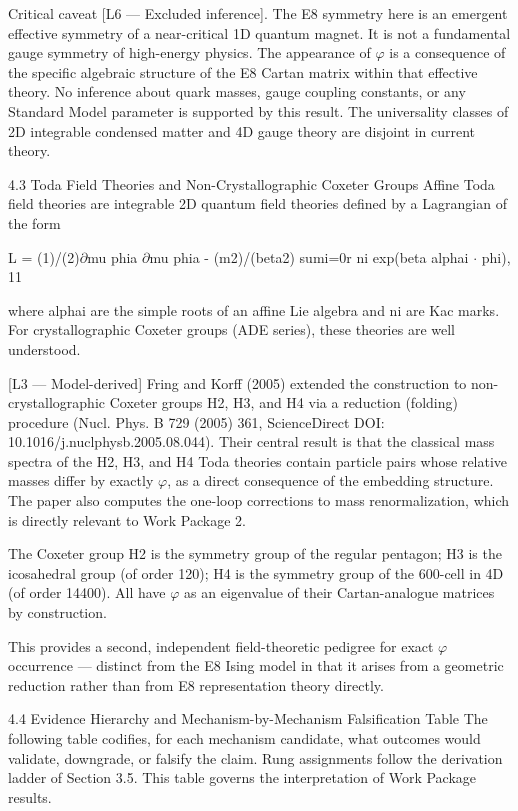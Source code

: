   Critical caveat [L6 --- Excluded inference]. The E8 symmetry here is an emergent
  effective symmetry of a near-critical 1D quantum magnet. It is not a fundamental gauge
  symmetry of high-energy physics. The appearance of $\varphi$ is a consequence of the specific
  algebraic structure of the E8 Cartan matrix within that effective theory. No inference
  about quark masses, gauge coupling constants, or any Standard Model parameter is
  supported by this result. The universality classes of 2D integrable condensed matter
  and 4D gauge theory are disjoint in current theory.

  4.3 Toda Field Theories and Non-Crystallographic Coxeter Groups
  Affine Toda field theories are integrable 2D quantum field theories defined by a
  Lagrangian of the form

  L = (1)/(2)$\partial$mu phia $\partial$mu phia - (m2)/(beta2) sumi=0r ni exp(beta alphai $\cdot$ phi), 11

  where alphai are the simple roots of an affine Lie algebra and ni are Kac marks. For
  crystallographic Coxeter groups (ADE series), these theories are well understood.

  [L3 --- Model-derived] Fring and Korff (2005) extended the construction to
  non-crystallographic Coxeter groups H2, H3, and H4 via a reduction (folding)
  procedure     (Nucl.   Phys.     B    729     (2005)   361,    ScienceDirect      DOI:
  10.1016/j.nuclphysb.2005.08.044). Their central result is that the classical mass
  spectra of the H2, H3, and H4 Toda theories contain particle pairs whose relative
  masses differ by exactly $\varphi$, as a direct consequence of the embedding structure. The
  paper also computes the one-loop corrections to mass renormalization, which is directly
  relevant to Work Package 2.

  The Coxeter group H2 is the symmetry group of the regular pentagon; H3 is the
  icosahedral group (of order 120); H4 is the symmetry group of the 600-cell in 4D (of
  order 14400). All have $\varphi$ as an eigenvalue of their Cartan-analogue matrices by
  construction.

  This provides a second, independent field-theoretic pedigree for exact $\varphi$ occurrence ---
  distinct from the E8 Ising model in that it arises from a geometric reduction rather than
  from E8 representation theory directly.

  4.4 Evidence Hierarchy and Mechanism-by-Mechanism Falsification
  Table
  The following table codifies, for each mechanism candidate, what outcomes would
  validate, downgrade, or falsify the claim. Rung assignments follow the derivation ladder
  of Section 3.5. This table governs the interpretation of Work Package results.